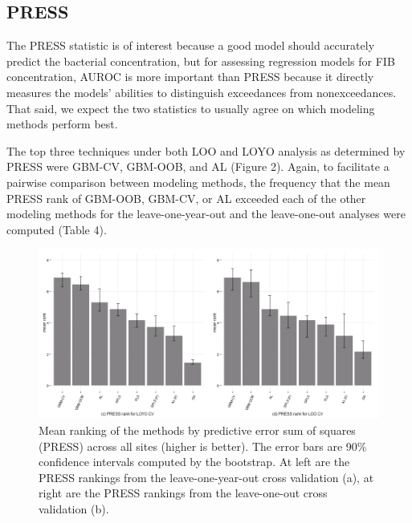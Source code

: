 \documentclass[authoryear,review, 12pt]{elsarticle}
\begin{document}
\subsection{PRESS}\label{press}

The PRESS statistic is of interest because a good model should
accurately predict the bacterial concentration, but for assessing
regression models for FIB concentration, AUROC is more important than
PRESS because it directly measures the models' abilities to distinguish
exceedances from nonexceedances. That said, we expect the two statistics
to usually agree on which modeling methods perform best.

The top three techniques under both LOO and LOYO analysis as determined
by PRESS were GBM-CV, GBM-OOB, and AL (Figure 2). Again, to facilitate a
pairwise comparison between modeling methods, the frequency that the
mean PRESS rank of GBM-OOB, GBM-CV, or AL exceeded each of the other
modeling methods for the leave-one-year-out and the leave-one-out
analyses were computed (Table 4).

\begin{figure}[htbp]
\centering
\includegraphics{figure/press-barchart.png}
\caption{Mean ranking of the methods by predictive error sum of squares
(PRESS) across all sites (higher is better). The error bars are 90\%
confidence intervals computed by the bootstrap. At left are the PRESS
rankings from the leave-one-year-out cross validation (a), at right are
the PRESS rankings from the leave-one-out cross validation (b).}
\end{figure}
\end{document}
